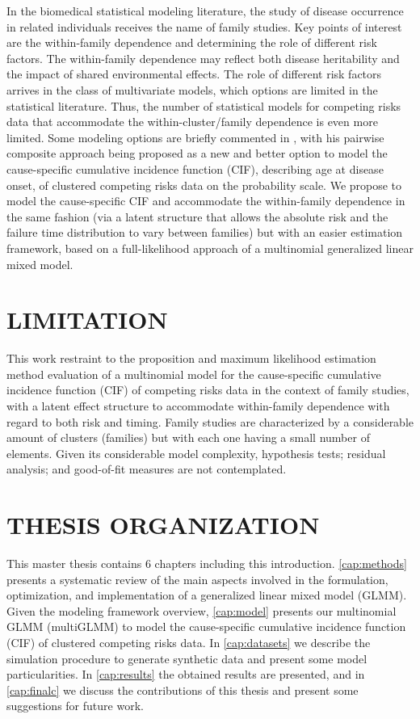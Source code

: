 In the biomedical statistical modeling literature, the study of disease
occurrence in related individuals receives the name of family studies.
Key points of interest are the within-family dependence and determining
the role of different risk factors. The within-family dependence may
reflect both disease heritability and the impact of shared environmental
effects. The role of different risk factors arrives in the class of
multivariate models, which options are limited in the statistical
literature. Thus, the number of statistical models for competing risks
data that accommodate the within-cluster/family dependence is even more
limited. Some modeling options are briefly commented in
, with his pairwise composite approach being
proposed as a new and better option to model the cause-specific
cumulative incidence function (CIF), describing age at disease onset, of
clustered competing risks data on the probability scale. We propose to
model the cause-specific CIF and accommodate the within-family
dependence in the same fashion (via a latent structure that allows the
absolute risk and the failure time distribution to vary between
families) but with an easier estimation framework, based on a
full-likelihood approach of a multinomial generalized linear mixed
model.

\section{LIMITATION}

This work restraint to the proposition and maximum likelihood estimation
method evaluation of a multinomial model for the cause-specific
cumulative incidence function (CIF) of competing risks data in the
context of family studies, with a latent effect structure to accommodate
within-family dependence with regard to both risk and timing. Family
studies are characterized by a considerable amount of clusters
(families) but with each one having a small number of elements. Given
its considerable model complexity, hypothesis tests; residual analysis;
and good-of-fit measures are not contemplated.

\section{THESIS ORGANIZATION}

This master thesis contains 6 chapters including this introduction.
\autoref{cap:methods} presents a systematic review of the main aspects
involved in the formulation, optimization, and implementation of a
generalized linear mixed model (GLMM). Given the modeling framework
overview, \autoref{cap:model} presents our multinomial GLMM (multiGLMM)
to model the cause-specific cumulative incidence function (CIF) of
clustered competing risks data. In \autoref{cap:datasets} we describe
the simulation procedure to generate synthetic data and present some
model particularities. In \autoref{cap:results} the obtained results are
presented, and in \autoref{cap:finalc} we discuss the contributions of
this thesis and present some suggestions for future work.

